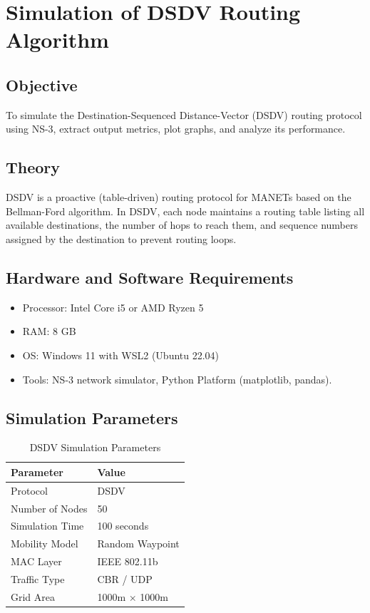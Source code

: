 \documentclass[12pt,a4paper]{report}
\begin{document}
\chapter{Simulation of DSDV Routing Algorithm}

\section{Objective}
To simulate the Destination-Sequenced Distance-Vector (DSDV) routing protocol using NS-3, extract output metrics, plot graphs, and analyze its performance.

\section{Theory}
DSDV is a proactive (table-driven) routing protocol for MANETs based on the Bellman-Ford algorithm. In DSDV, each node maintains a routing table listing all available destinations, the number of hops to reach them, and sequence numbers assigned by the destination to prevent routing loops.

\section{Hardware and Software Requirements}
\begin{itemize}
    \item Processor: Intel Core i5 or AMD Ryzen 5
    \item RAM: 8 GB
    \item OS: Windows 11 with WSL2 (Ubuntu 22.04)
    \item Tools: NS-3 network simulator, Python Platform (matplotlib, pandas).
\end{itemize}

\section{Simulation Parameters}
\begin{table}[H]
    \centering
    \caption{DSDV Simulation Parameters}
    \begin{tabular}{@{}ll@{}}
    \toprule
    \textbf{Parameter} & \textbf{Value} \\ \midrule
    Protocol & DSDV \\
    Number of Nodes & 50 \\
    Simulation Time & 100 seconds \\
    Mobility Model & Random Waypoint \\
    MAC Layer & IEEE 802.11b \\
    Traffic Type & CBR / UDP \\
    Grid Area & 1000m $\times$ 1000m \\ \bottomrule
    \end{tabular}
\end{table}
\end{document}
